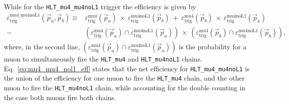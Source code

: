 While for the \verb=HLT_mu4_mu4noL1= trigger the efficiency is given by
\begin{align}
\varepsilon_{\mathrm{trig}}^{\mathrm{mu4\_mu4noL1}}
(\vec{p}_{a},\vec{p}_{b}) \equiv&
 \varepsilon_{\mathrm{trig}}^{\mathrm{mu4}} (\vec{p}_{a})\ \times\  \varepsilon_{\mathrm{trig}}^{\mathrm{mu4noL1}} (\vec{p}_{b})\ +\ 
 \varepsilon_{\mathrm{trig}}^{\mathrm{mu4}} (\vec{p}_{b})\ \times\  \varepsilon_{\mathrm{trig}}^{\mathrm{mu4noL1}} (\vec{p}_{a})\nonumber  \\
 -\ & 
(\varepsilon_{\mathrm{trig}}^{\mathrm{mu4}} (\vec{p}_{a}) \cap \varepsilon_{\mathrm{trig}}^{\mathrm{mu4noL1}} (\vec{p}_{a}))\ \times\ 
(\varepsilon_{\mathrm{trig}}^{\mathrm{mu4}} (\vec{p}_{b}) \cap \varepsilon_{\mathrm{trig}}^{\mathrm{mu4noL1}} (\vec{p}_{b})),
\label{eq:mu4_mu4_nol1_eff}
\end{align}
where, in the second line, $(\varepsilon_{\mathrm{trig}}^{\mathrm{mu4}} (\vec{p}_{a}) \cap \varepsilon_{\mathrm{trig}}^{\mathrm{mu4noL1}} (\vec{p}_{a}))$
  is the probability for a muon to simultaneously fire the  \verb=HLT_mu4= and \verb=HLT_mu4noL1= chains.
Eq.~\eqref{eq:mu4_mu4_nol1_eff} states that the net efficiency for \verb=HLT_mu4_mu4noL1=
  is the union of the efficiency for one muon to fire the \verb=HLT_mu4= chain,  
  and the other muon to fire the \verb=HLT_mu4noL1= chain, while accounting for the double counting
  in the case both muons fire both chains.


